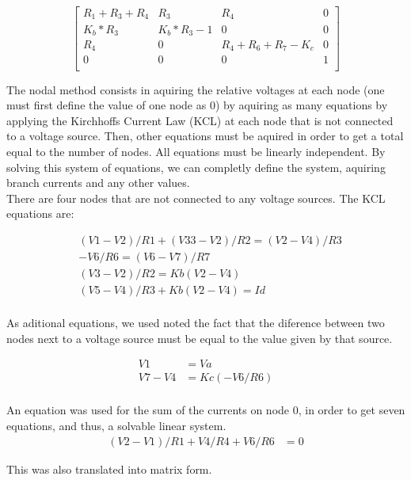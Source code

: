 $$
\begin{bmatrix} 
R_1+R_3+R_4 & R_3       & R_4             & 0 \\       
K_b*R_3     & K_b*R_3-1 & 0               & 0 \\
R_4         &     0     & R_4+R_6+R_7-K_c & 0 \\
0           & 0         & 0               & 1 \\
\end {bmatrix} 
$$
\quad

The nodal method consists in aquiring the relative voltages at each node (one must first define the value of one node as 0) by aquiring as many equations by applying the Kirchhoffs Current Law (KCL) at each node that is not connected to a voltage source. Then, other equations must be aquired in order to get a total equal to the number of nodes. All equations must be linearly independent. By solving this system of equations, we can completly define the system, aquiring branch currents and any other values.\\

There are four nodes that are not connected to any voltage sources. The KCL equations are: 

\begin{align*} 
&(V1-V2)/R1+(V33-V2)/R2 = (V2-V4)/R3 \\ 
&-V6/R6 = (V6-V7)/R7\\
&(V3-V2)/R2 = Kb(V2-V4) \\
&(V5-V4)/R3+Kb(V2-V4) = Id \\
\end{align*}

 
As aditional equations, we used noted the fact that the diference between two nodes next to a voltage source must be equal to the value given by that source. 

\begin{align*} 
V1&=Va \\ V7-V4&=Kc(-V6/R6)\\
\end{align*}

An equation was used for the sum of the currents on node 0, in order to get seven equations, and thus, a solvable linear system.
\begin{align*} 
(V2-V1)/R1+V4/R4+V6/R6&=0
\end{align*}
 
This was also translated into matrix form.

